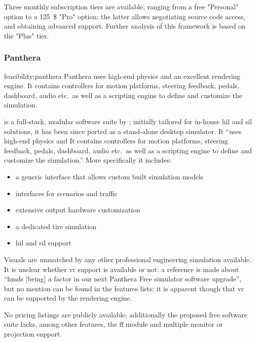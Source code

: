 Three monthly subscription tiers are available, ranging from a free "Personal" option to a \SI{125}{\$} "Pro" option; the latter allows negotiating source code access, and obtaining advanced support. Further analysis of this \gls{framework} is based on the "Plus" tier.

\subsubsection{Panthera}

\begin{excerpt}{feasibility:panthera}
	Panthera uses high-end physics and an excellent rendering engine. It contains controllers for motion platforms, steering feedback, pedals, dashboard, audio etc.\ as well as a scripting engine to define and customize the simulation.
\end{excerpt}

 is a full-stack, modular software suite by ; initially tailored for in-house \gls{hil} and \gls{sil} solutions, it has been since ported as a stand-alone desktop simulator. It \enquote{uses high-end physics and \CHARomissis{} It contains controllers for motion platforms, steering feedback, pedals, dashboard, audio etc.\ as well as a scripting engine to define and customize the simulation.}{\cite{feasibility:panthera}} More specifically it includes:

\begin{itemize}
	\item a generic interface that allows custom built simulation models
    \item interfaces for scenarios and traffic
    \item extensive output hardware customization
    \item a dedicated tire simulation
    \item \gls{hil} and \gls{sil} support
\end{itemize}

Visuals are unmatched by any other professional engineering simulation available. It is unclear whether \gls{vr} support is available or not: a reference is made about \enquote{\glspl{hmd} [being] a factor in our next Panthera Free simulator software upgrade}{\cite{feasibility:pantheravr}}, but no mention can be found in the features lists; it is apparent though that \gls{vr} can be supported by the rendering engine.

No pricing listings are publicly available; additionally the proposed free software suite lacks, among other features, the \gls{ff} module and multiple monitor or projection support.

